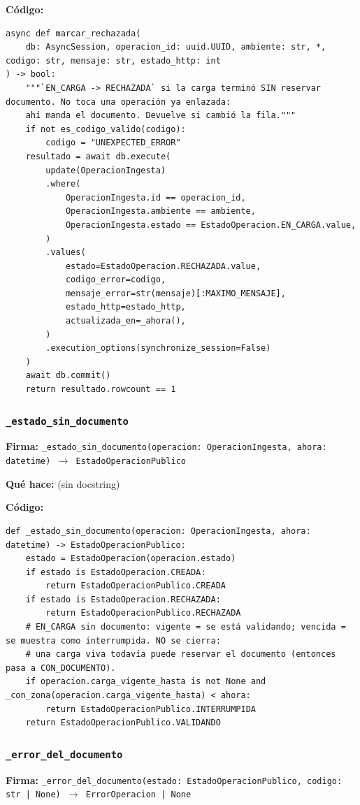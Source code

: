 \documentclass[11pt,a4paper]{article}
\begin{document}
\textbf{Código:}
\begin{lstlisting}
async def marcar_rechazada(
    db: AsyncSession, operacion_id: uuid.UUID, ambiente: str, *, codigo: str, mensaje: str, estado_http: int
) -> bool:
    """`EN_CARGA -> RECHAZADA` si la carga terminó SIN reservar documento. No toca una operación ya enlazada:
    ahí manda el documento. Devuelve si cambió la fila."""
    if not es_codigo_valido(codigo):
        codigo = "UNEXPECTED_ERROR"
    resultado = await db.execute(
        update(OperacionIngesta)
        .where(
            OperacionIngesta.id == operacion_id,
            OperacionIngesta.ambiente == ambiente,
            OperacionIngesta.estado == EstadoOperacion.EN_CARGA.value,
        )
        .values(
            estado=EstadoOperacion.RECHAZADA.value,
            codigo_error=codigo,
            mensaje_error=str(mensaje)[:MAXIMO_MENSAJE],
            estado_http=estado_http,
            actualizada_en=_ahora(),
        )
        .execution_options(synchronize_session=False)
    )
    await db.commit()
    return resultado.rowcount == 1
\end{lstlisting}

\subsubsection*{\texttt{\_estado\_sin\_documento}}
\textbf{Firma:} \texttt{\_estado\_sin\_documento(operacion: OperacionIngesta, ahora: datetime) $\rightarrow$ EstadoOperacionPublico}

\textbf{Qué hace:} (sin docstring)

\textbf{Código:}
\begin{lstlisting}
def _estado_sin_documento(operacion: OperacionIngesta, ahora: datetime) -> EstadoOperacionPublico:
    estado = EstadoOperacion(operacion.estado)
    if estado is EstadoOperacion.CREADA:
        return EstadoOperacionPublico.CREADA
    if estado is EstadoOperacion.RECHAZADA:
        return EstadoOperacionPublico.RECHAZADA
    # EN_CARGA sin documento: vigente = se está validando; vencida = se muestra como interrumpida. NO se cierra:
    # una carga viva todavía puede reservar el documento (entonces pasa a CON_DOCUMENTO).
    if operacion.carga_vigente_hasta is not None and _con_zona(operacion.carga_vigente_hasta) < ahora:
        return EstadoOperacionPublico.INTERRUMPIDA
    return EstadoOperacionPublico.VALIDANDO
\end{lstlisting}

\subsubsection*{\texttt{\_error\_del\_documento}}
\textbf{Firma:} \texttt{\_error\_del\_documento(estado: EstadoOperacionPublico, codigo: str | None) $\rightarrow$ ErrorOperacion | None}
\end{document}

